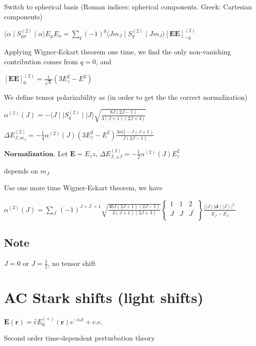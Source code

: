 \documentclass{article}
\begin{document}
    Switch to spherical basis (Roman indices: spherical components. Greek:
Cartesian components)

$\langle \alpha \mid S^{(2)}_{\mu \nu} \mid \alpha \rangle E_{\mu} E_{\nu}  = \sum_q (-1)^{q} \langle J m_J \mid S^{(2)}_q \mid J m_J \rangle [\textbf{EE}]^{(2)}_{-q}$

Applying Wigner-Eckart theorem one time, we find the only non-vanishing
contribution comes from $q = 0$, and

$[\textbf{EE}]^{(2)}_{0} = \frac{1}{\sqrt{6}}(3E_z^2 - E^2)$

We define tensor polarizability as (in order to get the the correct
normalization)

$\alpha^{(2)}(J) = -\langle J \mid \mid S^{(2)}_q \mid \mid J \rangle \sqrt{\frac{8J(2J-1)}{3(J+1)(2J+3)}}$

$\Delta E_{J, m_J} ^{(2)} = -\frac{1}{4} \alpha^{(2)} (J) (3E_z^2 - E^2) \frac{3 m_J^2 - J(J+1)}{J(2J-1)}$

$\textbf{Normalization.}$ Let $\textbf{E} = E_z \hat{z}$,
$\Delta E_{J, \pm{J}} ^{(2)} = -\frac{1}{2} \alpha^{(2)}(J) E_z^2$

depends on $m_J$

Use one more time Wigner-Eckart theorem, we have

$\alpha^{(2)}(J) =  \sum_{J^{'}} (-1)^{J + J^{'} + 1} \sqrt{\frac{40J (2J+1)(2J-1)}{3(J+1)(2J+3)}}\begin{Bmatrix} 1 & 1 & 2 \\ J & J  & J^{'} \\ \end{Bmatrix} \frac{\mid \langle J \mid\mid \textbf{d} \mid\mid J^{'}\rangle \mid^2}{E_J - E_{J}^{'}}$

    \subsection{Note}\label{note}

    $J = 0$ or $J = \frac{1}{2}$, no tensor shift

    \section{AC Stark shifts (light
shifts)}\label{ac-stark-shifts-light-shifts}

    $\textbf{E}(\textbf{r}) = \hat{\varepsilon} E_0^{(+)} (\textbf{r}) e^{-i \omega t} + c.c.$

Second order time-dependent perturbation theory
\end{document}
